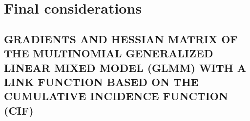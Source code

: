 \documentclass[12pt, %
               openright, %
               oneside, %
               a4paper, %
               chapter=TITLE, %
               section=TITLE, %
               brazil,
               english %
]{abntex2}
\renewcommand{\ABNTEXchapterfontsize}{\bfseries\large}
\begin{document}
\chapter{Final considerations}
\label{cap:finalc}

\setlength{\afterchapskip}{\baselineskip}

\postextual
\begin{apendicesenv}
\partapendices
{}
\renewcommand{\ABNTEXchapterfontsize}{\ABNTEXsectionfont}

\chapter{GRADIENTS AND HESSIAN MATRIX OF THE MULTINOMIAL
  GENERALIZED LINEAR MIXED MODEL (GLMM) WITH A LINK
  FUNCTION BASED ON THE CUMULATIVE INCIDENCE FUNCTION
  (CIF)}
\label{cap:appendixA}


\end{apendicesenv}
\end{document}
